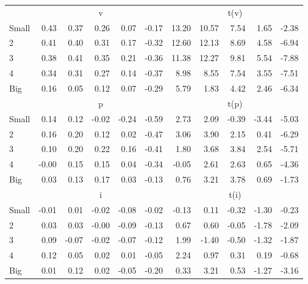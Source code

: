 \begin{table}[!ht]
\begin{tabular}{lrrrrrrrrrr}
  
     & \multicolumn{5}{c}{v} & \multicolumn{5}{c}{t(v)}   \\
     \cmidrule(r){2-6} \cmidrule(r){7-11} 
    Small  & 0.43  & 0.37  & 0.26  & 0.07  & -0.17  & 13.20  & 10.57  & 7.54  & 1.65  & -2.38   \\
    2  & 0.41  & 0.40  & 0.31  & 0.17  & -0.32  & 12.60  & 12.13  & 8.69  & 4.58  & -6.94   \\
    3  & 0.38  & 0.41  & 0.35  & 0.21  & -0.36  & 11.38  & 12.27  & 9.81  & 5.54  & -7.88   \\
    4  & 0.34  & 0.31  & 0.27  & 0.14  & -0.37  & 8.98  & 8.55  & 7.54  & 3.55  & -7.51   \\
    Big  & 0.16  & 0.05  & 0.12  & 0.07  & -0.29  & 5.79  & 1.83  & 4.42  & 2.46  & -6.34   \\
    
  
     & \multicolumn{5}{c}{p} & \multicolumn{5}{c}{t(p)}   \\
     \cmidrule(r){2-6} \cmidrule(r){7-11} 
    Small  & 0.14  & 0.12  & -0.02  & -0.24  & -0.59  & 2.73  & 2.09  & -0.39  & -3.44  & -5.03   \\
    2  & 0.16  & 0.20  & 0.12  & 0.02  & -0.47  & 3.06  & 3.90  & 2.15  & 0.41  & -6.29   \\
    3  & 0.10  & 0.20  & 0.22  & 0.16  & -0.41  & 1.80  & 3.68  & 3.84  & 2.54  & -5.71   \\
    4  & -0.00  & 0.15  & 0.15  & 0.04  & -0.34  & -0.05  & 2.61  & 2.63  & 0.65  & -4.36   \\
    Big  & 0.03  & 0.13  & 0.17  & 0.03  & -0.13  & 0.76  & 3.21  & 3.78  & 0.69  & -1.73   \\
    
  
     & \multicolumn{5}{c}{i} & \multicolumn{5}{c}{t(i)}   \\
     \cmidrule(r){2-6} \cmidrule(r){7-11} 
    Small  & -0.01  & 0.01  & -0.02  & -0.08  & -0.02  & -0.13  & 0.11  & -0.32  & -1.30  & -0.23   \\
    2  & 0.03  & 0.03  & -0.00  & -0.09  & -0.13  & 0.67  & 0.60  & -0.05  & -1.78  & -2.09   \\
    3  & 0.09  & -0.07  & -0.02  & -0.07  & -0.12  & 1.99  & -1.40  & -0.50  & -1.32  & -1.87   \\
    4  & 0.12  & 0.05  & 0.02  & 0.01  & -0.05  & 2.24  & 0.97  & 0.31  & 0.19  & -0.68   \\
    Big  & 0.01  & 0.12  & 0.02  & -0.05  & -0.20  & 0.33  & 3.21  & 0.53  & -1.27  & -3.16   \\
    

\end{tabular}
\end{table}
